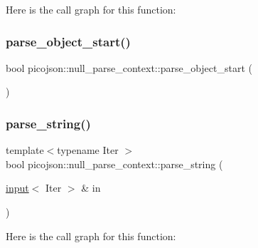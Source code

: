 Here is the call graph for this function\+:
\hypertarget{classpicojson_1_1null__parse__context_a95c208456592c33d53548fa88b831c7c}{}\label{classpicojson_1_1null__parse__context_a95c208456592c33d53548fa88b831c7c} 
\subsubsection{\texorpdfstring{parse\+\_\+object\+\_\+start()}{parse\_object\_start()}}
{\footnotesize\ttfamily bool picojson\+::null\+\_\+parse\+\_\+context\+::parse\+\_\+object\+\_\+start (\begin{DoxyParamCaption}{ }\end{DoxyParamCaption})\hspace{0.3cm}{\ttfamily [inline]}}

\hypertarget{classpicojson_1_1null__parse__context_aab2c7dee1eb5b477370832811cd40d14}{}\label{classpicojson_1_1null__parse__context_aab2c7dee1eb5b477370832811cd40d14} 
\subsubsection{\texorpdfstring{parse\+\_\+string()}{parse\_string()}}
{\footnotesize\ttfamily template$<$typename Iter $>$ \\
bool picojson\+::null\+\_\+parse\+\_\+context\+::parse\+\_\+string (\begin{DoxyParamCaption}\item[{\hyperlink{classpicojson_1_1input}{input}$<$ Iter $>$ \&}]{in }\end{DoxyParamCaption})\hspace{0.3cm}{\ttfamily [inline]}}

Here is the call graph for this function\+:
\hypertarget{classpicojson_1_1null__parse__context_aa77397f08cf7859fabc04e9e4460b93a}{}\label{classpicojson_1_1null__parse__context_aa77397f08cf7859fabc04e9e4460b93a} 
